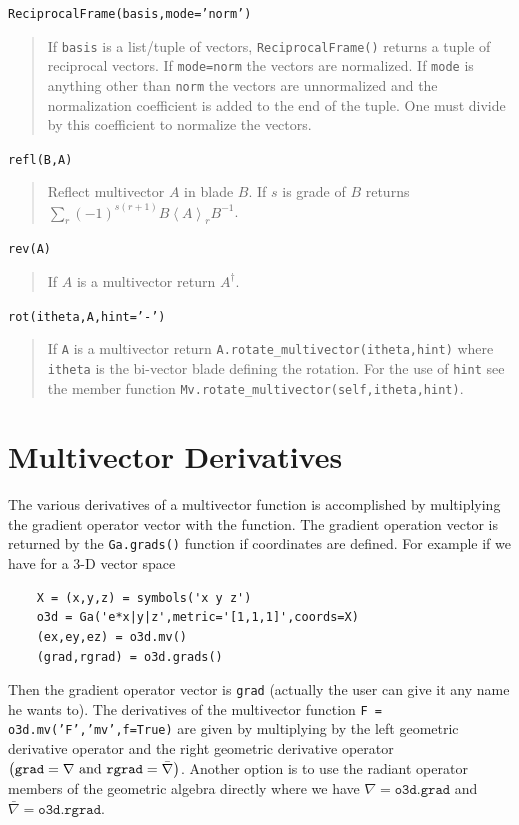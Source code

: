 \documentclass[12pt]{report}
\newcommand{\lp}{\left (}
\newcommand{\rp}{\right )}
\newcommand{\R}{\dagger}
\newcommand{\grade}[1]{\left < {#1} \right >}
\newcommand{\paren}[1]{\lp {#1} \rp}
\newcommand{\T}[1]{\texttt{#1}}
\begin{document}
\T{ReciprocalFrame(basis,mode='norm')}
\begin{quote}
   If \T{basis} is a list/tuple of vectors, \T{ReciprocalFrame()} returns a tuple of reciprocal
   vectors.  If \T{mode=norm} the vectors are normalized.  If \T{mode} is anything other than
   \T{norm} the vectors are unnormalized and the normalization coefficient is added to the
   end of the tuple.  One must divide by this coefficient to normalize the vectors.
\end{quote}

\T{refl(B,A)}
\begin{quote}
   Reflect multivector $A$ in blade $B$. If $s$ is grade of $B$
   returns $\sum_{r}(-1)^{s(r+1)}B\grade{A}_{r}B^{-1}$.
\end{quote}

\T{rev(A)}
\begin{quote}
    If $A$ is a multivector return $A^{\R}$.
\end{quote}

\T{rot(itheta,A,hint='-')}
\begin{quote}
    If \T{A} is a multivector return \T{A.rotate\_multivector(itheta,hint)} where \T{itheta} is the bi-vector blade defining the rotation.
    For the use of \T{hint} see the member function \T{Mv.rotate\_multivector(self,itheta,hint)}.

\end{quote}

\section{Multivector Derivatives}

The various derivatives of a multivector function is accomplished by
multiplying the gradient operator vector with the function.  The gradient
operation vector is returned by the \T{Ga.grads()} function if coordinates
are defined.  For example if we have for a 3-D vector space

\begin{lstlisting}
    X = (x,y,z) = symbols('x y z')
    o3d = Ga('e*x|y|z',metric='[1,1,1]',coords=X)
    (ex,ey,ez) = o3d.mv()
    (grad,rgrad) = o3d.grads()
\end{lstlisting}

Then the gradient operator vector is \T{grad} (actually the user can give
it any name he wants to).  The derivatives of the multivector
function \T{F = o3d.mv('F','mv',f=True)} are given by multiplying by the
left geometric derivative operator and the right geometric derivative operator
$\paren{\mbox{\T{grad}} = \nabla\mbox{ and } \mbox{\T{rgrad}} = \bar{\nabla}}$.  Another option
is to use the radiant operator members of the geometric algebra directly where we have
$\nabla = \T{o3d.grad}$ and $\bar{\nabla} = \T{o3d.rgrad}$.
\end{document}
